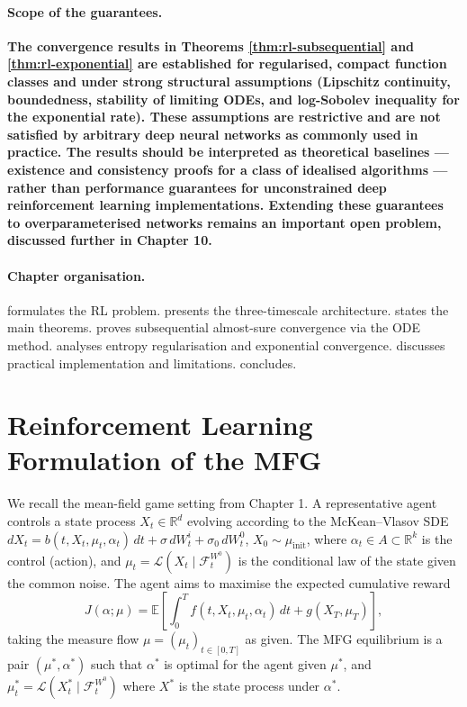 \paragraph{Scope of the guarantees.} \textbf{The convergence results in Theorems
\ref{thm:rl-subsequential} and \ref{thm:rl-exponential} are established for
regularised, compact function classes and under strong structural assumptions
(Lipschitz continuity, boundedness, stability of limiting ODEs, and log-Sobolev
inequality for the exponential rate). These assumptions are restrictive and are not
satisfied by arbitrary deep neural networks as commonly used in practice. The results
should be interpreted as theoretical baselines --- existence and consistency proofs
for a class of idealised algorithms --- rather than performance guarantees for
unconstrained deep reinforcement learning implementations. Extending these guarantees
to overparameterised networks remains an important open problem, discussed further in
Chapter 10.}

\paragraph{Chapter organisation.}  formulates the RL problem.
 presents the three-timescale architecture.
 states the main theorems. 
proves subsequential almost-sure convergence via the ODE method.
 analyses entropy regularisation and exponential convergence.
 discusses practical implementation and limitations.
 concludes.


\section{Reinforcement Learning Formulation of the MFG}
\label{sec:rl-formulation}

We recall the mean-field game setting from Chapter 1. A representative agent controls
a state process $X_t \in \mathbb{R}^d$ evolving according to the McKean--Vlasov SDE
$dX_t = b(t,X_t,\mu_t,\alpha_t)\, dt + \sigma\, dW_t^i + \sigma_0\, dW_t^0$, $X_0 \sim
\mu_{\mathrm{init}}$, where $\alpha_t \in A \subset \mathbb{R}^k$ is the control
(action), and $\mu_t = \mathcal{L}(X_t \mid \mathcal{F}_t^{W^0})$ is the conditional
law of the state given the common noise. The agent aims to maximise the expected
cumulative reward
\[
    J(\alpha; \mu) = \mathbb{E}\left[ \int_0^T f(t,X_t,\mu_t,\alpha_t)\, dt +
    g(X_T,\mu_T) \right],
\]
taking the measure flow $\mu = (\mu_t)_{t \in [0,T]}$ as given. The MFG equilibrium is
a pair $(\mu^*, \alpha^*)$ such that $\alpha^*$ is optimal for the agent given $\mu^*$,
and $\mu_t^* = \mathcal{L}(X_t^* \mid \mathcal{F}_t^{W^0})$ where $X^*$ is the state
process under $\alpha^*$.

